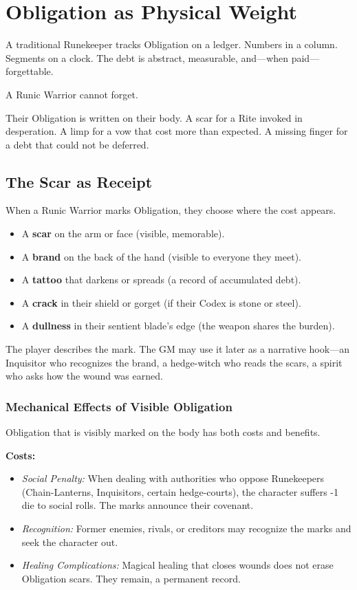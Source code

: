 \section{Obligation as Physical Weight}

A traditional Runekeeper tracks Obligation on a ledger. Numbers in a column. Segments on a clock. The debt is abstract, measurable, and—when paid—forgettable.

A Runic Warrior cannot forget.

Their Obligation is written on their body. A scar for a Rite invoked in desperation. A limp for a vow that cost more than expected. A missing finger for a debt that could not be deferred.

\subsection{The Scar as Receipt}

When a Runic Warrior marks Obligation, they choose where the cost appears.

\begin{itemize}
\item A \textbf{scar} on the arm or face (visible, memorable).
\item A \textbf{brand} on the back of the hand (visible to everyone they meet).
\item A \textbf{tattoo} that darkens or spreads (a record of accumulated debt).
\item A \textbf{crack} in their shield or gorget (if their Codex is stone or steel).
\item A \textbf{dullness} in their sentient blade's edge (the weapon shares the burden).
\end{itemize}

The player describes the mark. The GM may use it later as a narrative hook—an Inquisitor who recognizes the brand, a hedge-witch who reads the scars, a spirit who asks how the wound was earned.

\subsubsection{Mechanical Effects of Visible Obligation}

Obligation that is visibly marked on the body has both costs and benefits.

\textbf{Costs:}
\begin{itemize}
\item \textit{Social Penalty:} When dealing with authorities who oppose Runekeepers (Chain-Lanterns, Inquisitors, certain hedge-courts), the character suffers -1 die to social rolls. The marks announce their covenant.
\item \textit{Recognition:} Former enemies, rivals, or creditors may recognize the marks and seek the character out.
\item \textit{Healing Complications:} Magical healing that closes wounds does not erase Obligation scars. They remain, a permanent record.
\end{itemize}

